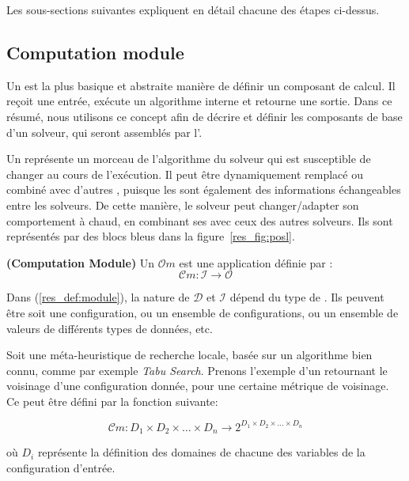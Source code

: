 Les sous-sections suivantes expliquent en détail chacune des étapes ci-dessus.

\subsection{Computation module}

Un \om{}  est la plus basique  et abstraite manière de définir un composant de calcul. Il reçoit une entrée, exécute un algorithme interne et retourne une sortie. Dans ce résumé, nous utilisons ce concept afin de décrire et définir les composants de base d'un  solveur, qui seront assemblés par l'\as.  

Un \om{} représente un  morceau de l'algorithme du solveur  qui est susceptible de changer au cours de  l'exécution. Il peut être dynamiquement remplacé  ou combiné avec d'autres  \oms, puisque les \oms{} sont également des informations  échangeables  entre  les solveurs. De cette manière, le solveur  peut changer/adapter son comportement à chaud, en combinant  ses \oms{} avec ceux  des autres solveurs. Ils sont  représentés par  des blocs  bleus dans  la figure~\ref{res_fig:posl}.

\begin{lemma}\label{res_def:module} \textbf{(Computation Module)}
Un \om{} $\mathcal{O}m$ est une application définie par :
\begin{equation}
 \mathcal{C}m:\mathcal{I} \rightarrow \mathcal{O}
\end{equation}
\end{lemma}

Dans (\ref{res_def:module}),  la nature de $\mathcal{D}$  et $\mathcal{I}$ dépend du type de \om{}. Ils peuvent être soit une configuration, ou un  ensemble de configurations, ou un ensemble de valeurs de différents types de données, etc.

Soit une méta-heuristique de recherche locale, basée sur un algorithme bien connu, comme par exemple {\it Tabu Search}. Prenons l'exemple d'un  \om{} retournant le voisinage d'une configuration donnée, pour une certaine métrique de voisinage. Ce \om{} peut être défini par la fonction suivante:

\begin{equation}
\mathcal{C}m:D_1\times D_2\times\dots\times D_n \rightarrow 2^{D_1\times D_2\times\dots\times D_n}
\end{equation}

où $D_i$  représente  la  définition  des  domaines  de  chacune  des variables de la configuration d'entrée.

